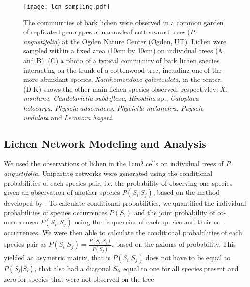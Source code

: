 \documentclass[9pt,twocolumn,twoside,lineno]{pnas-new}
\begin{document}
{\begin{figure}[ht]
\centering
\texttt{[image: lcn\_sampling.pdf]}
\caption{The communities of bark lichen were observed in a common
  garden of replicated genotypes of narrowleaf cottonwood trees
  (\textit{P. angustifolia}) at the Ogden Nature Center (Ogden,
  UT). Lichen were sampled within a fixed area (10cm by 10cm) on
  individual trees (A and B). (C) a photo of a typical community of
  bark lichen species interacting on the trunk of a cottonwood tree,
  including one of the more abundant species, \textit{Xanthomendoza
    galericulata}, in the center. (D-K) shows the other main lichen
  species observed, respectivley:  \textit{X. montana},
  \textit{Candelariella subdeflexa}, \textit{Rinodina} sp.,
  \textit{Caloplaca holocarpa}, \textit{Physcia adscendens},
  \textit{Phyciella melanchra}, \textit{Physcia undulata} and
  \textit{Lecanora hageni}.}
\label{fig:lichen_sampling}
\end{figure}



\subsection*{Lichen Network Modeling and Analysis}

We used the observations of lichen in the 1cm2 cells on individual
trees of \textit{P. angustifolia}. Unipartite networks were generated
using the conditional probabilities of each species pair, i.e. the
probability of observing one species given an observation of another
species $P(S_i | S_j)$, based on the method developed by
\citep{Araujo2011}. To calculate conditional probabilities, we
quantified the individual probabilities of species occurrences
$P(S_i)$ and the joint probability of co-occurrences $P(S_i,S_j)$
using the frequencies of each species and their co-occurrences. We
were then able to calculate the conditional probabilities of each
species pair as $P(S_i|S_j) = \frac{P(S_i,S_j)}{P(S_j)}$, based on the
axioms of probability. This yielded an asymetric matrix, that is
$P(S_i|S_j)$ does not have to be equal to $P(S_j|S_i)$, that also had
a diagonal $S_{ii}$ equal to one for all species present and zero for
species that were not observed on the tree.

}
\end{document}
